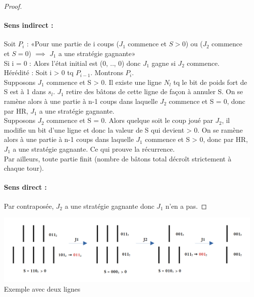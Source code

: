 \begin{proof}
	\paragraph{Sens indirect : } 
	Soit $P_{i}$ : «Pour une partie de i coups ($J_{1}$ commence et $S > 0$) ou ($J_{2}$ commence et $S = 0$) $\implies$ $J_{1}$ a une stratégie gagnante»\\
	Si i = 0 : Alors l'état initial est (0, .., 0) donc $J_{1}$ gagne si $J_{2}$ commence.\\
	Hérédité : Soit i > 0 tq $P_{i-1}$. Montrons $P_{i}$. \\
	Supposons $J_{1}$ commence et S > 0. Il existe une ligne $N_{l}$ tq le bit de poids fort de S est à 1 dans $s_{l}$. $J_{1}$ retire des bâtons de cette ligne de façon à annuler  S. On se ramène alors à une partie à n-1 coups dans laquelle $J_{2}$ commence et S = 0, donc par HR, $J_{1}$ a une stratégie gagnante. \\
	Supposons $J_{2}$ commence et S = 0. Alors quelque soit le coup joué par $J_{2}$, il modifie un bit d'une ligne et donc la valeur de S qui devient > 0. On se ramène alors à une partie à n-1 coups dans laquelle $J_{1}$ commence et S > 0, donc par HR, $J_{1}$ a une stratégie gagnante. Ce qui prouve la récurrence. \\
	Par ailleurs, toute partie finit (nombre de bâtons total décroît strictement à chaque tour).
	\paragraph{Sens direct : }
	Par contraposée,  $J_{2}$ a une stratégie gagnante donc $J_{1}$ n'en a pas. 
\end{proof}
\begin{center}
	\includegraphics[scale=0.35]{Developpements/Nim/nim.png}
	{Exemple avec deux lignes}
\end{center}
